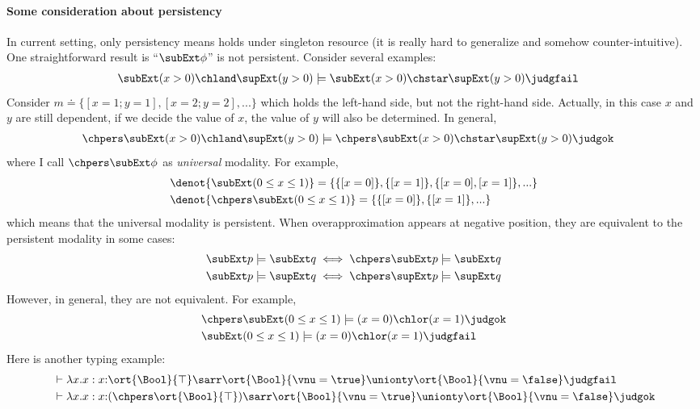 \paragraph{Some consideration about persistency} In current setting, only persistency means holds under singleton resource (it is really hard to generalize and somehow counter-intuitive). One straightforward result is ``$\subExt \phi$'' is not persistent. Consider several examples:
\begin{align*}
  &\subExt (x > 0)\chland \supExt (y > 0) \models \subExt (x > 0)\chstar \supExt (y > 0) \judgfail
\end{align*}\noindent
Consider $m \doteq \{ [x=1;y=1], [x=2;y=2], ... \}$ which holds the left-hand side, but not the right-hand side. Actually, in this case $x$ and $y$ are still dependent, if we decide the value of $x$, the value of $y$ will also be determined. In general, 
\begin{align*}
  &\chpers \subExt (x > 0)\chland \supExt (y > 0) \models \chpers\subExt (x > 0)\chstar \supExt (y > 0) \judgok
\end{align*}\noindent
where I call $\chpers \subExt \phi$ as \emph{universal} modality. For example,
\begin{align*}
  &\denot{\subExt (0 \leq x \leq 1)} =\{ \{ [x=0] \},  \{ [x=1] \}, \{ [x=0], [x=1] \}, ... \}
  \\&\denot{\chpers \subExt (0 \leq x \leq 1)} =\{ \{ [x=0] \},  \{ [x=1] \}, ... \}
\end{align*}\noindent
which means that the universal modality is persistent. When overapproximation appears at negative position, they are equivalent to the persistent modality in some cases:
\begin{align*}
  &\subExt p \models \subExt q \iff \chpers \subExt p \models \subExt q
  \\&\subExt p \models \supExt q \iff \chpers \supExt p \models \supExt q
\end{align*}\noindent
However, in general, they are not equivalent. For example,
\begin{align*}
  &\chpers \subExt (0 \leq x \leq 1) \models (x = 0) \chlor (x = 1) \judgok
  \\&\subExt (0 \leq x \leq 1) \models (x = 0) \chlor (x = 1) \judgfail
\end{align*}\noindent
Here is another typing example:
\begin{align*}
  & \vdash \lambda x.x : x{:}\ort{\Bool}{\top} \sarr \ort{\Bool}{\vnu = \true} \unionty \ort{\Bool}{\vnu = \false} \judgfail
  \\&\vdash \lambda x.x : x{:}(\chpers\ort{\Bool}{\top}) \sarr \ort{\Bool}{\vnu = \true} \unionty \ort{\Bool}{\vnu = \false} \judgok
\end{align*}\noindent
